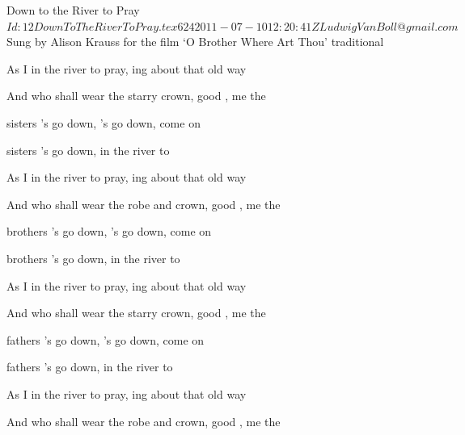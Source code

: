 \begin{SBSong}{Down to the River to Pray}
  {$Id: 12DownToTheRiverToPray.tex 624 2011-07-10 12:20:41Z LudwigVanBoll@gmail.com $}
  {Sung by Alison Krauss for the film `O Brother Where Art Thou'}
  {traditional}
  \begin{SBVerse}
    As I  in the river to pray, ing about that  old way
    
    And who shall wear the starry crown, good , \WBLineBrk {} me the 

     sisters 's go down, 's go down, come on 

     sisters 's go down,  in the river to  
  \end{SBVerse}
  \begin{SBVerse}
    As I  in the river to pray, ing about that  old way

    And who shall wear the robe and crown, good , \WBLineBrk {} me the 
  
     brothers 's go down, 's go down, come on 

     brothers 's go down,  in the river to  
  \end{SBVerse}
  \begin{SBVerse}
    As I  in the river to pray, ing about that  old way
    
    And who shall wear the starry crown, good , \WBLineBrk {} me the 

     fathers 's go down, 's go down, come on 
 
     fathers 's go down,  in the river to  
  \end{SBVerse}
  \begin{SBVerse}
    As I  in the river to pray, ing about that  old way
    
    And who shall wear the robe and crown, good , \WBLineBrk {} me the 
  

\end{SBVerse}
\end{SBSong}
